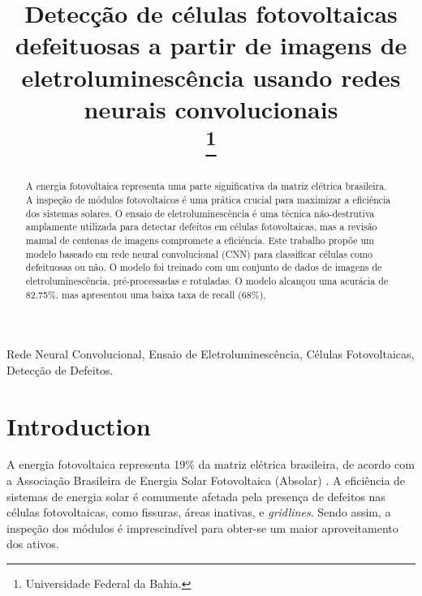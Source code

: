 \documentclass[conference]{IEEEtran}
\begin{document}
\title{Detecção de células fotovoltaicas defeituosas a partir de imagens de
    eletroluminescência usando redes neurais convolucionais\\
    \thanks{Universidade Federal da Bahia.}
}

\author{
}

\maketitle

\begin{abstract}
    A energia fotovoltaica representa uma parte significativa da matriz
    elétrica brasileira. A inspeção de módulos fotovoltaicos é uma prática
    crucial para maximizar a eficiência dos sistemas solares. O ensaio de
    eletroluminescência é
    uma técnica não-destrutiva amplamente utilizada para detectar defeitos em
    células fotovoltaicas, mas a revisão manual de centenas de imagens
    compromete a eficiência. Este trabalho propõe um modelo baseado em rede
    neural convolucional (CNN) para classificar células como defeituosas ou
    não. O modelo foi treinado com um conjunto de dados de imagens de
    eletroluminescência, pré-processadas e rotuladas. O modelo alcançou uma
    acurácia de 82.75\%, mas apresentou uma baixa taxa de recall (68\%),
\end{abstract}

\begin{IEEEkeywords}
    Rede Neural Convolucional, Ensaio de Eletroluminescência, Células
    Fotovoltaicas, Detecção de Defeitos.
\end{IEEEkeywords}

\section{Introduction}
A energia fotovoltaica representa 19\% da matriz elétrica brasileira, de
acordo com a Associação Brasileira de Energia Solar Fotovoltaica (Absolar)
\cite{absolar2024}. A eficiência de sistemas de energia solar é comumente
afetada pela presença de defeitos nas células fotovoltaicas, como fissuras,
áreas inativas, e \textit{gridlines}. Sendo assim, a inspeção dos módulos
é imprescindível para obter-se um maior aproveitamento dos ativos.
\end{document}
